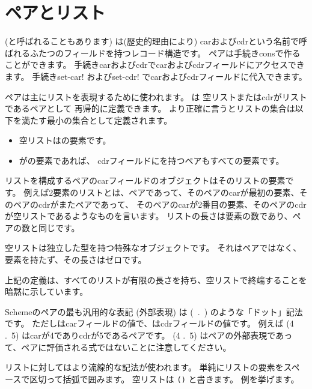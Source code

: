 \section{ペアとリスト}
\label{listsection}

 (と呼ばれることもあります)
は(歴史的理由により) carおよびcdrという名前で呼ばれるふたつのフィールドを持つレコード構造です。
ペアは手続き{\cf cons}で作ることができます。
手続き{\cf car}および{\cf cdr}でcarおよびcdrフィールドにアクセスできます。
手続き{\cf set-car!} および{\cf set-cdr!} でcarおよびcdrフィールドに代入できます。

ペアは主にリストを表現するために使われます。
は
空リストまたはcdrがリストであるペアとして
再帰的に定義できます。
より正確に言うとリストの集合は以下を満たす最小の集合として定義されます。

\begin{itemize}
\item 空リストはの要素です。
\item {}がの要素であれば、
      cdrフィールドにを持つペアもすべての要素です。
\end{itemize}

リストを構成するペアのcarフィールドのオブジェクトはそのリストの要素です。
例えば2要素のリストとは、ペアであって、そのペアのcarが最初の要素、そのペアのcdrがまたペアであって、
そのペアのcarが2番目の要素、そのペアのcdrが空リストであるようなものを言います。
リストの長さは要素の数であり、ペアの数と同じです。

空リストは独立した型を持つ特殊なオブジェクトです。
それはペアではなく、要素を持たず、その長さはゼロです。

\begin{note}
上記の定義は、すべてのリストが有限の長さを持ち、空リストで終端することを暗黙に示しています。
\end{note}

Schemeのペアの最も汎用的な表記 (外部表現) は
\hbox{\cf ( .\ )}
のような「ドット」記法です。
ただしはcarフィールドの値で、はcdrフィールドの値です。
例えば {\cf (4 .\ 5)} はcarが4でありcdrが5であるペアです。
{\cf (4 .\ 5)} はペアの外部表現であって、ペアに評価される式ではないことに注意してください。

リストに対してはより流線的な記法が使われます。
単純にリストの要素をスペースで区切って括弧で囲みます。
空リストは {\tt()} と書きます。
例を挙げます。

